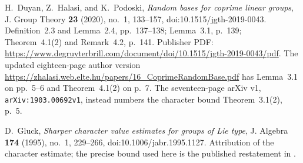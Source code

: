  H.~Duyan, Z.~Halasi, and K.~Podoski,
\emph{Random bases for coprime linear groups},
J. Group Theory \textbf{23} (2020), no.~1, 133--157,
doi:10.1515/jgth-2019-0043.
Definition~2.3 and Lemma~2.4, pp.~137--138;
Lemma~3.1, p.~139; Theorem~4.1(2) and Remark~4.2, p.~141.
Publisher PDF:
\url{https://www.degruyterbrill.com/document/doi/10.1515/jgth-2019-0043/pdf}.
The updated eighteen-page author version
\url{https://zhalasi.web.elte.hu/papers/16_CoprimeRandomBase.pdf}
has Lemma~3.1 on pp.~5--6 and Theorem~4.1(2) on p.~7.
The seventeen-page arXiv v1, \texttt{arXiv:1903.00692v1}, instead
numbers the character bound Theorem~3.1(2), p.~5.

 D.~Gluck,
\emph{Sharper character value estimates for groups of Lie type},
J. Algebra \textbf{174} (1995), no.~1, 229--266,
doi:10.1006/jabr.1995.1127.
Attribution of the character estimate; the precise bound used here
is the published restatement in \cite[Theorem~4.1(2)]{BI:DHP}.
